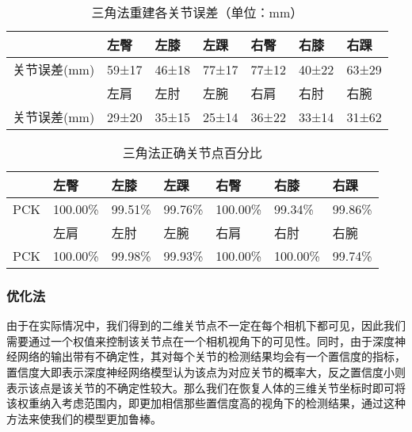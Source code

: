 \begin{table}[H]
    \centering
    \begin{tabular}{lllllll}
        \hline
                      & 左臀   & 左膝   & 左踝   & 右臀   & 右膝   & 右踝   \\
        \hline
         关节误差(mm) & 59±17  & 46±18  & 77±17  & 77±12  & 40±22  & 63±29  \\
                      & 左肩   & 左肘   & 左腕   & 右肩   & 右肘   & 右腕   \\
         关节误差(mm) & 29±20  & 35±15  & 25±14  & 36±22  & 33±14  & 31±62  \\
        \hline
        \end{tabular}
    \caption{三角法重建各关节误差（单位：mm）\label{tab:3derrorjoint}}
\end{table} 

\begin{table}[H]
    \centering
    \begin{tabular}{lllllll}
        \hline
             & 左臀    & 左膝   & 左踝   & 右臀    & 右膝    & 右踝   \\
        \hline
         PCK & 100.00\% & 99.51\% & 99.76\% & 100.00\% & 99.34\%  & 99.86\% \\
             & 左肩    & 左肘   & 左腕   & 右肩    & 右肘    & 右腕   \\
         PCK & 100.00\% & 99.98\% & 99.93\% & 100.00\% & 100.00\% & 99.74\% \\
        \hline
    \end{tabular}
    \caption{三角法正确关节点百分比\label{tab:3dpck}}
\end{table}


\subsubsection{优化法}
由于在实际情况中，我们得到的二维关节点不一定在每个相机下都可见，因此我们需要通过一个权值来控制该关节点在一个相机视角下的可见性。同时，由于深度神经网络的输出带有不确定性，其对每个关节的检测结果均会有一个置信度的指标，置信度大即表示深度神经网络模型认为该点为对应关节的概率大，反之置信度小则表示该点是该关节的不确定性较大。那么我们在恢复人体的三维关节坐标时即可将该权重纳入考虑范围内，即更加相信那些置信度高的视角下的检测结果，通过这种方法来使我们的模型更加鲁棒。

